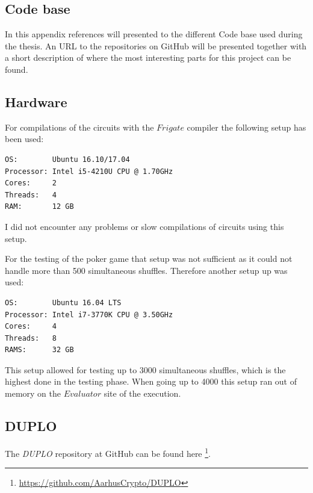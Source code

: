 \documentclass[twoside,11pt,openright]{report}
\newcommand{\DUPLO}{\textit{DUPLO} }
\begin{document}

\begin{appendices}
\chapter{Code base}
In this appendix references will presented to the different Code base used during the thesis. An URL to the repositories on GitHub will be presented together with a short description of where the most interesting parts for this project can be found.

\section{Hardware}
\label{app:hardware}
For compilations of the circuits with the $Frigate$ compiler the following setup has been used:

\begin{center}
\begin{verbatim}
OS:        Ubuntu 16.10/17.04
Processor: Intel i5-4210U CPU @ 1.70GHz
Cores:     2
Threads:   4
RAM:       12 GB
\end{verbatim}
\end{center}

I did not encounter any problems or slow compilations of circuits using this setup.

\bigskip
For the testing of the poker game that setup was not sufficient as it could not handle more than 500 simultaneous shuffles. Therefore another setup up was used:

\begin{center}
\begin{verbatim}
OS:        Ubuntu 16.04 LTS
Processor: Intel i7-3770K CPU @ 3.50GHz
Cores:     4
Threads:   8
RAMS:      32 GB
\end{verbatim}
\end{center}

This setup allowed for testing up to 3000 simultaneous shuffles, which is the highest done in the testing phase. When going up to 4000 this setup ran out of memory on the $Evaluator$ site of the execution.


\section{DUPLO}
\label{app:duplo}
The \DUPLO repository at GitHub can be found here \footnote{\url{https://github.com/AarhusCrypto/DUPLO}}.


\end{appendices}
\end{document}
